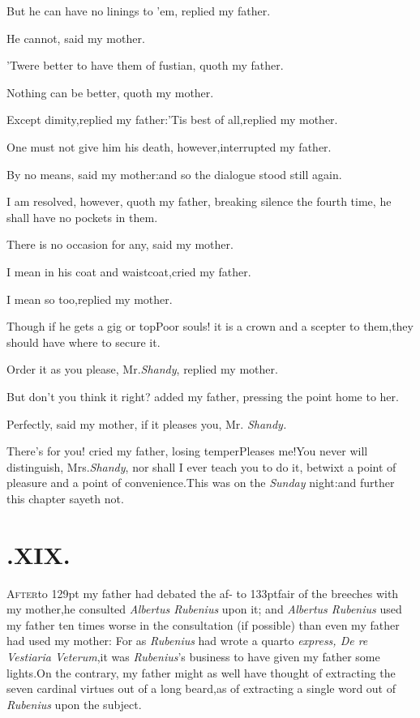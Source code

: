 \documentclass{article}
\begin{document}
But he can have no linings to ’em, replied my
father.\tsh

He cannot, said my mother.

’Twere better to have them of fustian, quoth my
father.

Nothing can be better, quoth my mother.\tsh

\tsh Except dimity,\tsk replied my
father:\tsh ’Tis best of all,\tsk replied my
mother.

\tsh One must not give him his death,
however,\tsk interrupted my father.

By no means, said my mother:\tsh and so the dialogue
stood still again.

I am resolved, however, quoth my\break 
father, breaking silence the fourth time,\break
he shall have no pockets in them.\tsh

\tsh There is no occasion for any,\break
said my mother.\tsh

I mean in his coat and waistcoat,\tsk cried my father.

\tsh I mean so too,\tsk replied my mother.

\tsh Though if he gets a gig or top\break\tsh Poor
souls! it is a crown and a scepter to them,\tsk they should have
where to secure it.\tsh

Order it as you please, Mr.\@ \textit{Shandy}, replied my
mother.\tsh{}

\tsh But don’t you think it right? added my
father, pressing the point home to her.

Perfectly, said my mother, if it pleases you, Mr.
\textit{Shandy.}\tsh

\tsh There’s for you! cried my father, losing
temper\tsh Pleases me!\tsh You never will
distinguish, Mrs.\@ \textit{Shandy}, nor shall I ever teach you to do it, betwixt a point of
pleasure and a point of convenience.\tsh This was on the
\textit{Sunday} night:\tsh and further this chapter sayeth
not.

\smallskip

\section{.\enspace XIX.}

\lettrine{A}{\!fter}\hbox to 129pt{ my father had debated the af-}\break
\hbox to 133pt{{\!fair of the breeches with my mother,}}\break\tsk he consulted
\textit{Albertus Rubenius} upon it; and \textit{Albertus Rubenius} used
my father ten times worse in the consultation (if possible) than
even my father had used my mother: For as \textit{Rubenius} had wrote
a quarto \textit{express, De re Vestiaria Veterum},\tsk it was
\textit{Rubenius}’s business to have given my father some
lights.\tsk On the contrary, my father might as well have thought
of extracting the seven cardinal virtues out of a long
beard,\tsk as of extracting a single word out of \textit{Rubenius}
upon the subject.
\end{document}
